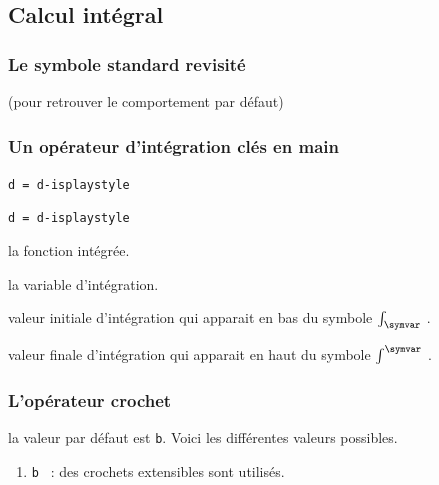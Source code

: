 \documentclass[12pt,a4paper]{book}
\theoremstyle{definition}
\newcommand\extraspace{
	\vspace{0.25em}
}
\newcommand\mwhyprefix[2]{%
	\texttt{#1 = #1-#2}%
}
\begin{document}
{{\subsection{Calcul intégral}

\subsubsection{Le symbole standard revisité}



 (pour retrouver le comportement par défaut)




\subsubsection{Un opérateur d'intégration clés en main}





\extraspace

 \hfill \mwhyprefix{d}{isplaystyle}

 \hfill \mwhyprefix{d}{isplaystyle}


 la fonction intégrée.

 la variable d'intégration.

 valeur initiale d'intégration qui apparait en bas du symbole $\int_{\symvar}$ .

 valeur finale d'intégration qui apparait en haut du symbole $\int^{\symvar}$ .





\subsubsection{L'opérateur \og crochet \fg}






\IDoption{} la valeur par défaut est \verb+b+. Voici les différentes valeurs possibles.
\begin{enumerate}
	\item \verb+b + : des crochets extensibles sont utilisés.


\end{enumerate}}}
\end{document}

